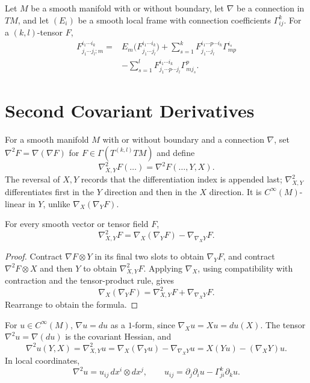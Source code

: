 \begin{proposition}
\label{prop:total-covariant-derivative-components}
Let $M$ be a smooth manifold with or without boundary, let $\nabla$ be a
connection in $TM$, and let $(E_i)$ be a smooth local frame with connection
coefficients $\Gamma^k_{ij}$. For a $(k,l)$-tensor $F$,
\[
\begin{aligned}
F^{i_1\cdots i_k}_{j_1\cdots j_l;m}
={}&E_m\bigl(F^{i_1\cdots i_k}_{j_1\cdots j_l}\bigr)
+\sum_{s=1}^kF^{i_1\cdots p\cdots i_k}_{j_1\cdots j_l}\Gamma^{i_s}_{mp}\\
&-\sum_{s=1}^lF^{i_1\cdots i_k}_{j_1\cdots p\cdots j_l}\Gamma^p_{mj_s}.
\end{aligned}
\]
\end{proposition}

\section{Second Covariant Derivatives}

For a smooth manifold $M$ with or without boundary and a connection $\nabla$,
set $\nabla^2F=\nabla(\nabla F)$ for $F\in\Gamma(T^{(k,l)}TM)$ and define
\[
\nabla^2_{X,Y}F(\ldots)=\nabla^2F(\ldots,Y,X).
\]
The reversal of $X,Y$ records that the differentiation index is appended last;
$\nabla^2_{X,Y}$ differentiates first in the $Y$ direction and then in the
$X$ direction. It is $C^\infty(M)$-linear in $Y$, unlike
$\nabla_X(\nabla_YF)$.

\begin{proposition}
\label{prop:second-covariant-derivative-formula}



For every smooth vector or tensor field $F$,
\[
\nabla^2_{X,Y}F=\nabla_X(\nabla_YF)-\nabla_{\nabla_XY}F.
\]
\end{proposition}
\begin{proof}
\sketch Contract $\nabla F\otimes Y$ in its final two slots to obtain
$\nabla_YF$, and contract $\nabla^2F\otimes X$ and then $Y$ to obtain
$\nabla^2_{X,Y}F$. Applying $\nabla_X$, using compatibility with contraction
and the tensor-product rule, gives
\[
\nabla_X(\nabla_YF)=\nabla^2_{X,Y}F+\nabla_{\nabla_XY}F.
\]
Rearrange to obtain the formula.
\end{proof}

\begin{example}
\label{ex:covariant-hessian}




For $u\in C^\infty(M)$, $\nabla u=du$ as a $1$-form, since
$\nabla_Xu=Xu=du(X)$. The tensor $\nabla^2u=\nabla(du)$ is the covariant
Hessian, and
\[
\nabla^2u(Y,X)=\nabla^2_{X,Y}u
=\nabla_X(\nabla_Yu)-\nabla_{\nabla_XY}u
=X(Yu)-(\nabla_XY)u.
\]
In local coordinates,
\[
\nabla^2u=u_{ij}\,dx^i\otimes dx^j,
\qquad u_{ij}=\partial_j\partial_i u-\Gamma^k_{ji}\partial_ku.
\]
\end{example}


